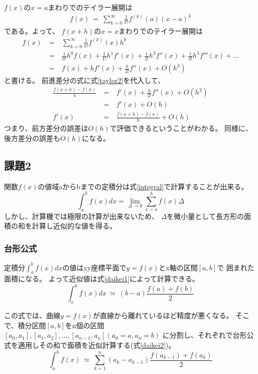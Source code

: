 \documentclass[dvipdfmx]{jsarticle}
\begin{document}
$f(x)$の$x=a$まわりでのテイラー展開は
\begin{eqnarray}
  f(x) ~=~ \sum_{k=0}^{\infty} \frac{1}{k!} f^{(k)}(a)(x-a)^k
  \label{taylor1}
\end{eqnarray}
である。よって、
$f(x+h)$の$x=x$まわりでのテイラー展開は
\begin{eqnarray}
  f(x) ~&=&~ \sum_{k=0}^{\infty} \frac{1}{k!} f^{(k)}(x)h^k \nonumber\\
  &=&~ \frac{1}{0!}h^0f(x) + \frac{1}{1!}h^1f'(x) + \frac{1}{2!}h^2f''(x) + \frac{1}{3!}h^3f'''(x) + \dots \nonumber\\
  &=&~ f(x) + hf'(x) + \frac{h}{2!}f''(x) + O(h^3)
  \label{taylor2}
\end{eqnarray}
と書ける。
前進差分の式に式\ref{taylor2}を代入して、
\begin{eqnarray}
  \frac{f(x+h)-f(x)}{h} ~&=&~ f'(x)+\frac{h}{2!}f''(x)+O(h^2) \\
  &=&~ f'(x) + O(h) \\
  f'(x) ~&=&~ \frac{f(x+h)-f(x)}{h}+O(h)
  \label{err1}
\end{eqnarray}
つまり、前方差分の誤差は$O(h)$で評価できるということがわかる。
同様に、後方差分の誤差も$O(h)$になる。

\subsection{課題2}

関数$f(x)$の値域aからbまでの定積分は式\ref{integral}で計算することが出来る。
\begin{equation}
  \int_a^b f(x) dx = \lim_{\Delta \to 0} \sum_{x=a}^{b} f(x) \Delta
  \label{integral}
\end{equation}
しかし、計算機では極限の計算が出来ないため、
$\Delta$を微小量として長方形の面積の和を計算し近似的な値を得る。

\subsubsection{台形公式}
定積分$\int_a^b f(x)dx$の値はxy座標平面で$y=f(x)$とx軸の区間$[a,b]$で
囲まれた面積になる。
よって近似値は式\ref{daikei1}によって計算できる。
\begin{equation}
  \int_a^b f(x)dx ~\simeq~ (b-a)\frac{f(a)+f(b)}{2}
  \label{daikei1}
\end{equation}

この式では、曲線$y=f(x)$が直線から離れているほど精度が悪くなる。
そこで、積分区間$[a,b]$をn個の区間$[a_0,a_1],[a_1,a_2],...,[a_{n-1},a_n] (a_0=a,a_n=b)$
に分割し、それぞれで台形公式を適用しその和で面積を近似計算する(式\ref{daikei2})。
\begin{equation}
  \int_a^b f(x) ~\simeq~ \sum_{k=1}^{n} (a_k-a_{k-1})\frac{f(a_{k-1})+f(a_k)}{2}
  \label{daikei2}
\end{equation}
\end{document}
